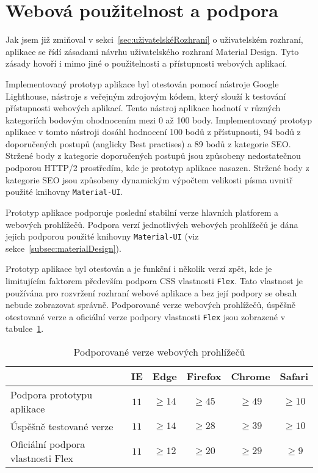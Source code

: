 
\section{Webová použitelnost a podpora}\label{sec:webováPoužitelnostAPodpora}

Jak jsem již zmiňoval v sekci~\ref{sec:uživatelskéRozhraní} o uživatelském rozhraní, aplikace se řídí zásadami návrhu uživatelského rozhraní Material Design.
Tyto zásady hovoří i mimo jiné o použitelnosti a přístupnosti webových aplikací.

Implementovaný prototyp aplikace byl otestován pomocí nástroje Google Lighthouse, nástroje s veřejným zdrojovým kódem, který slouží k testování přístupnosti webových aplikací.
Tento nástroj aplikace hodnotí v různých kategoriích bodovým ohodnocením mezi 0 až 100 body.
Implementovaný prototyp aplikace v tomto nástroji dosáhl hodnocení 100 bodů z přístupnosti, 94 bodů z doporučených postupů (anglicky Best practises) a 89 bodů z kategorie \gls{SEO}.
Stržené body z kategorie doporučených postupů jsou způsobeny nedostatečnou podporou \gls{HTTP}/2 prostředím, kde je prototyp aplikace nasazen.
Stržené body z kategorie \gls{SEO} jsou způsobeny dynamickým výpočtem velikosti písma uvnitř použité knihovny \texttt{Material-UI}.

Prototyp aplikace podporuje poslední stabilní verze hlavních platforem a webových prohlížečů.
Podpora verzí jednotlivých webových prohlížečů je dána jejich podporou použité knihovny \texttt{Material-UI} (viz sekce~\ref{subsec:materialDesign}).

Prototyp aplikace byl otestován a je funkční i několik verzí zpět, kde je limitujícím faktorem především podpora \acrshort{CSS} vlastnosti \texttt{Flex}.
Tato vlastnost je používána pro rozvržení rozhraní webové aplikace a bez její podpory se obsah nebude zobrazovat správně.
Podporované verze webových prohlížečů, úspěšně otestované verze a oficiální verze podpory vlastnosti \texttt{Flex} jsou zobrazené v tabulce~\ref{tab:verzeProhlížečů}.

\begin{table}[ht!]
    \centering
    \caption{Podporované verze webových prohlížečů}
    \label{tab:verzeProhlížečů}
    \begin{tabular}{l|ccccc}
        & IE & Edge & Firefox & Chrome & Safari \\ \hline
        Podpora prototypu aplikace & $11$ & $\geq 14$ & $\geq 45$ & $\geq 49$ & $\geq 10$ \\
        Úspěšně testované verze & $11$ & $\geq 14$ & $\geq 28$ & $\geq 39$ & $\geq 10$ \\
        Oficiální podpora vlastnosti Flex & $11$ & $\geq 12$ & $\geq 20$ & $\geq 29$ & $\geq 9$
    \end{tabular}
\end{table}

